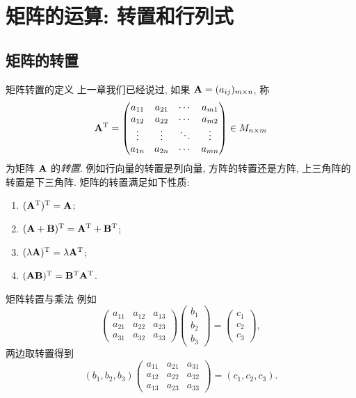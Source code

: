 \section{矩阵的运算: 转置和行列式}

\subsection{矩阵的转置}

\begin{frame}{矩阵转置的定义}
	\onslide<+->
	上一章我们已经说过, 如果 ${\mathbf{A}}=(a_{ij})_{m\times n}$, 称
	\[{\mathbf{A}}^{\mathrm{T}}=\begin{pmatrix}
		a_{11}&a_{21}&\cdots&a_{m1}\\
		a_{12}&a_{22}&\cdots&a_{m2}\\
		\vdots&\vdots&\ddots&\vdots\\
		a_{1n}&a_{2n}&\cdots&a_{mn}
	\end{pmatrix}\in M_{n\times m}\]
	为矩阵 ${\mathbf{A}}$ 的\emph{转置}.
	\onslide<+->
	例如行向量的转置是列向量, 方阵的转置还是方阵, 上三角阵的转置是下三角阵.
	\onslide<+->
	矩阵的转置满足如下性质:
	\begin{enumerate}
		\item $({\mathbf{A}}^{\mathrm{T}})^{\mathrm{T}}={\mathbf{A}}$;
		\item $({\mathbf{A}}+{\mathbf{B}})^{\mathrm{T}}={\mathbf{A}}^{\mathrm{T}}+{\mathbf{B}}^{\mathrm{T}}$;
		\item $(\lambda{\mathbf{A}})^{\mathrm{T}}=\lambda{\mathbf{A}}^{\mathrm{T}}$;
		\item \alert{$({\mathbf{A}}{\mathbf{B}})^{\mathrm{T}}={\mathbf{B}}^{\mathrm{T}}{\mathbf{A}}^{\mathrm{T}}$}.
	\end{enumerate}
\end{frame}


\begin{frame}{矩阵转置与乘法}
	\onslide<+->
	例如
	\[\begin{pmatrix}
		a_{11}&a_{12}&a_{13}\\
		a_{21}&a_{22}&a_{23}\\
		a_{31}&a_{32}&a_{33}
	\end{pmatrix}\begin{pmatrix}
		b_1\\b_2\\b_3
	\end{pmatrix}=\begin{pmatrix}
		c_1\\c_2\\c_3
	\end{pmatrix},\]
	\onslide<+->
	两边取转置得到
	\[(b_1,b_2,b_3)\begin{pmatrix}
		a_{11}&a_{21}&a_{31}\\
		a_{12}&a_{22}&a_{32}\\
		a_{13}&a_{23}&a_{33}
	\end{pmatrix}=(c_1,c_2,c_3).\]
\end{frame}


